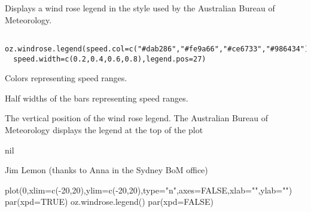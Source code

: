 \begin{Description}\relax
Displays a wind rose legend in the style used by the Australian Bureau 
of Meteorology.
\end{Description}
\begin{Usage}
\begin{verbatim}
 oz.windrose.legend(speed.col=c("#dab286","#fe9a66","#ce6733","#986434"),
  speed.width=c(0.2,0.4,0.6,0.8),legend.pos=27)
\end{verbatim}
\end{Usage}
\begin{Arguments}
\begin{ldescription}
\item[\code{speed.col}] Colors representing speed ranges.
\item[\code{speed.width}] Half widths of the bars representing speed ranges.
\item[\code{legend.pos}] The vertical position of the wind rose legend. The
Australian Bureau of Meteorology displays the legend at the top of
the plot
\end{ldescription}
\end{Arguments}
\begin{Value}
nil
\end{Value}
\begin{Author}\relax
Jim Lemon (thanks to Anna in the Sydney BoM office)
\end{Author}
\begin{SeeAlso}\relax
{}
\end{SeeAlso}
\begin{Examples}
\begin{ExampleCode}
 plot(0,xlim=c(-20,20),ylim=c(-20,20),type="n",axes=FALSE,xlab="",ylab="")
 par(xpd=TRUE)
 oz.windrose.legend()
 par(xpd=FALSE)
\end{ExampleCode}
\end{Examples}

